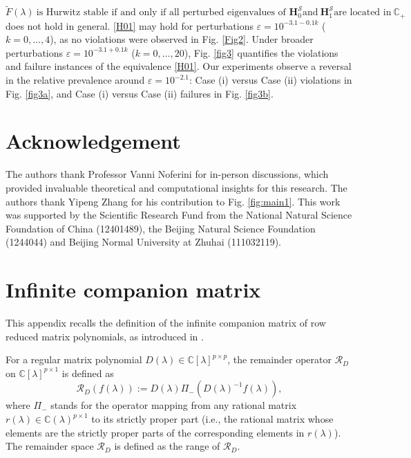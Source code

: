 \documentclass[12pt,reqno]{amsart}
\theoremstyle{plain}
\numberwithin{equation}{section}
\theoremstyle{remark}
\def\wtilde{\widetilde} \def\what{\widehat}
\begin{document}
 \begin{equation}\label{H01} 
\wtilde F(\lambda)\ \mbox{is Hurwitz stable if and only if all perturbed eigenvalues of } \mathbf{H}_{0}^{\mathscr S} \mbox{and}\ \mathbf{H}_{1}^{\mathscr S} \mbox{are located in}\ \mathbb C_+ 
\end{equation}
 does not hold in general. \eqref{H01} may hold for perturbations 
$\varepsilon = 10^{-3.1-0.1k}$ ($k = 0, \dots, 4$), as no violations were observed in Fig. \ref{Fig2}. Under broader perturbations $\varepsilon=10^{-3.1+0.1k}$ ($k=0,\ldots,20$),
 Fig. \ref{fig3} quantifies the violations and failure instances of the equivalence \eqref{H01}. Our experiments observe a reversal in the relative prevalence around $\varepsilon=10^{-2.1}$: Case (i) versus Case (ii) violations in Fig. \ref{fig3a}, and Case (i) versus Case (ii) failures in Fig. \ref{fig3b}.

\section*{Acknowledgement}
The authors thank  Professor Vanni Noferini  for in-person discussions, which provided invaluable theoretical and computational insights for this research.
The authors thank  Yipeng Zhang for his contribution to Fig. \ref{fig:main1}. This work was supported by the Scientific Research Fund from the National Natural Science Foundation of China (12401489), the Beijing Natural Science Foundation (1244044) and Beijing Normal University at Zhuhai (111032119).


\appendix

\section{Infinite companion matrix}\label{SecApp}

This appendix recalls the definition of the infinite companion matrix of row reduced matrix polynomials, as introduced in \cite{BPV1999,BPV}.

For a regular matrix polynomial $D(\lambda)\in \mathbb C[\lambda]^{p\times p}$, the remainder operator $\mathcal R_D$ on 
$ \mathbb C[\lambda]^{p\times 1}$ is defined as
$$
\mathcal R_D(f(\lambda)):=D(\lambda) 
\varPi_- (D(\lambda)^{-1} f(\lambda)), 
$$
where $\varPi_-$ stands for the operator mapping from any rational matrix $r(\lambda)\in \mathbb C(\lambda)^{p\times 1}$ to its strictly proper part (i.e., the rational matrix whose elements are the strictly proper parts of the corresponding elements in $r(\lambda)$). 
The remainder space $\mathscr R_D$ is defined as the range of $\mathcal R_D$. 
\end{document}
